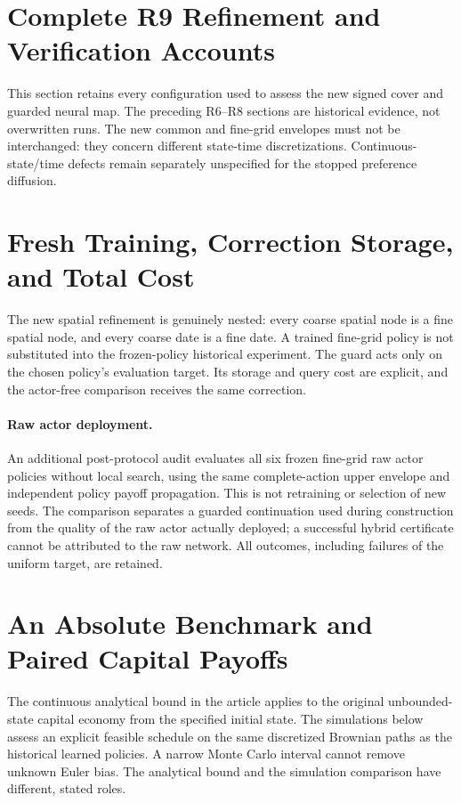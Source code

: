 \section{Complete R9 Refinement and Verification Accounts}
This section retains every configuration used to assess the new signed cover and guarded neural map. The preceding R6--R8 sections are historical evidence, not overwritten runs. The new common and fine-grid envelopes must not be interchanged: they concern different state-time discretizations. Continuous-state/time defects remain separately unspecified for the stopped preference diffusion.



\clearpage
\section{Fresh Training, Correction Storage, and Total Cost}
The new spatial refinement is genuinely nested: every coarse spatial node is a fine spatial node, and every coarse date is a fine date. A trained fine-grid policy is not substituted into the frozen-policy historical experiment. The guard acts only on the chosen policy's evaluation target. Its storage and query cost are explicit, and the actor-free comparison receives the same correction.


\paragraph{Raw actor deployment.}
An additional post-protocol audit evaluates all six frozen fine-grid raw actor policies without local search, using the same complete-action upper envelope and independent policy payoff propagation. This is not retraining or selection of new seeds. The comparison separates a guarded continuation used during construction from the quality of the raw actor actually deployed; a successful hybrid certificate cannot be attributed to the raw network. All outcomes, including failures of the uniform target, are retained.



\clearpage
\section{An Absolute Benchmark and Paired Capital Payoffs}
The continuous analytical bound in the article applies to the original unbounded-state capital economy from the specified initial state. The simulations below assess an explicit feasible schedule on the same discretized Brownian paths as the historical learned policies. A narrow Monte Carlo interval cannot remove unknown Euler bias. The analytical bound and the simulation comparison have different, stated roles.


